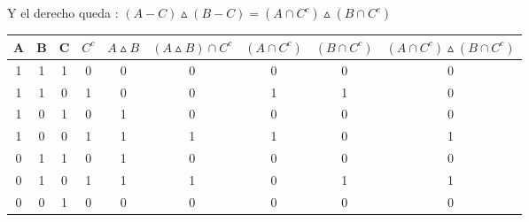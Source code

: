 \documentclass[10pt]{article}
\begin{document}
\begin{ej}
\begin{itemize}
	Y el derecho queda : $(A - C) \vartriangle (B - C) = (A \cap C^c) \vartriangle (B \cap C^c)$
\begin{table}[H]
	\begin{center}
		\begin{tabular}{|c|c|c|c|c|c|c|c|c|}
			\hline
A & B & C & $C^c$ & $A \vartriangle B$  &  $(A \vartriangle B) \cap C^c$  &  $(A \cap C^c)$  &   $(B \cap C^c)$   &   $(A \cap C^c) \vartriangle (B \cap C^c)$  \\ 
 			\hline
1 & 1 & 1 &     0      &               0                   &                     0                                 &              0              &               0               &                              0                                              \\ 
 			\hline
1 & 1 & 0 &      1     &               0                   &                     0                                 &              1              &               1               &                              0                                              \\ 
 			\hline
1 & 0 & 1 &      0     &               1                   &                     0                                 &              0              &               0               &                              0                                               \\ 
 			\hline
1 & 0 & 0 &      1     &               1                   &                     1                                 &              1              &               0               &                              1                                              \\ 
 			\hline
0 & 1 & 1 &      0     &               1                   &                     0                                 &              0              &               0               &                              0                                               \\ 
 			\hline 			
0 & 1 & 0 &      1     &               1                   &                     1                                 &              0              &               1               &                              1                                              \\ 
 			\hline
0 & 0 & 1 &      0     &               0                   &                     0                                 &              0              &               0               &                              0                                               \\ 

\end{tabular}
\end{center}
\end{table}
\end{itemize}
\end{ej}
\end{document}
